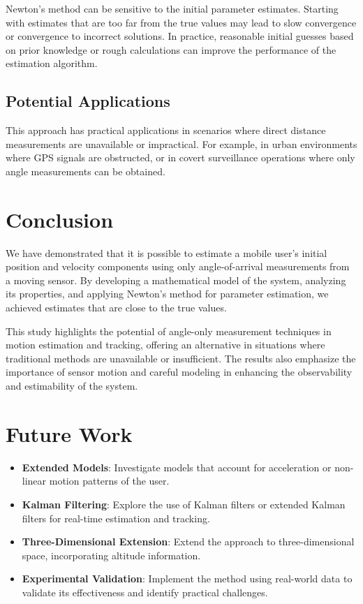 \documentclass[12pt]{article}
\begin{document}
Newton's method can be sensitive to the initial parameter estimates. Starting with estimates that are too far from the true values may lead to slow convergence or convergence to incorrect solutions. In practice, reasonable initial guesses based on prior knowledge or rough calculations can improve the performance of the estimation algorithm.

\subsection{Potential Applications}

This approach has practical applications in scenarios where direct distance measurements are unavailable or impractical. For example, in urban environments where GPS signals are obstructed, or in covert surveillance operations where only angle measurements can be obtained.

\section{Conclusion}

We have demonstrated that it is possible to estimate a mobile user's initial position and velocity components using only angle-of-arrival measurements from a moving sensor. By developing a mathematical model of the system, analyzing its properties, and applying Newton's method for parameter estimation, we achieved estimates that are close to the true values.

This study highlights the potential of angle-only measurement techniques in motion estimation and tracking, offering an alternative in situations where traditional methods are unavailable or insufficient. The results also emphasize the importance of sensor motion and careful modeling in enhancing the observability and estimability of the system.

\section{Future Work}

\begin{itemize}
    \item \textbf{Extended Models}: Investigate models that account for acceleration or non-linear motion patterns of the user.
    \item \textbf{Kalman Filtering}: Explore the use of Kalman filters or extended Kalman filters for real-time estimation and tracking.
    \item \textbf{Three-Dimensional Extension}: Extend the approach to three-dimensional space, incorporating altitude information.
    \item \textbf{Experimental Validation}: Implement the method using real-world data to validate its effectiveness and identify practical challenges.
\end{itemize}
\end{document}
